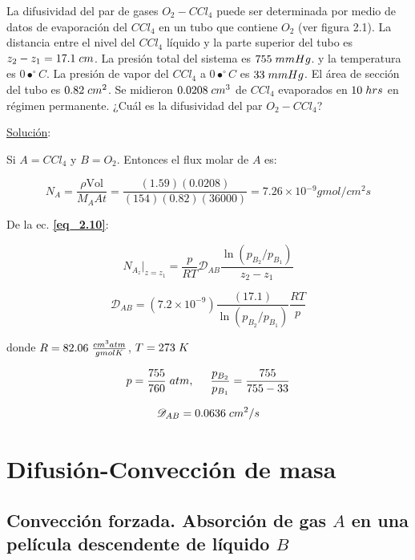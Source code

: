 La difusividad del par de gases $O_2 - CCl_4$ puede ser determinada por medio de datos de evaporación del $CCl_4$ en un tubo que contiene $O_2$ (ver figura 2.1). La distancia entre el nivel del $CCl_4$ líquido y la parte superior del tubo es $z_2 - z_1 = 17.1 \hspace{0.1cm} cm$. La presión total del sistema es $755 \hspace{0.1cm} mmHg$. y la temperatura es $0•^\circ C$. La presión de vapor del $CCl_4$ a $0•^\circ C$ es $33 \hspace{0.1cm} mmHg$. El área de sección del tubo es $0.82 \hspace{0.1cm} cm^2$. Se midieron $0.0208 \hspace{0.1cm} cm^3$ de $CCl_4$ evaporados en $10 \hspace{0.1cm} hrs$ en régimen permanente. ¿Cuál es la difusividad del par $O_2 - CCl_4$?

\underline{Solución}:

Si $A=CCl_4$ y $B=O_2$. Entonces el flux molar de $A$ es:

$$N_A = \frac{\rho \text{Vol}}{M_A At} = \frac{(1.59)(0.0208)}{(154)(0.82)(36000)} = 7.26 \times 10­^{-9} gmol/cm^2 s$$ 

De la ec. \textbf{\eqref{eq_2.10}}:

$$N_{A_z} | _{z=z_1} = \frac{p}{RT} \mathscr{D}_{AB} \frac{\ln{(p_{B_2}/p_{B_1})}}{z_2 - z_1}$$

$$\mathscr{D}_{AB} = (7.2 \times 10^{-9})\frac{(17.1)}{\ln{(p_{B_2}/p_{B_1})}} \frac{RT}{p}$$

donde $R = 82.06 \hspace{0.1cm} \frac{cm^3 atm}{gmol K}$, $T = 273 \hspace{0.1cm} K$

$$p = \frac{755}{760} \hspace{0.1cm} atm , \hspace{0.5cm} \frac{p_{B_2}}{p_{B_1}} = \frac{755}{755-33}$$

$$\mathscr{D}_{AB} = 0.0636 \hspace{0.1cm} cm^2/s$$
	
\section{Difusión-Convección de masa}

\subsection{Convección forzada. Absorción de gas $A$ en una película descendente de líquido $B$}

